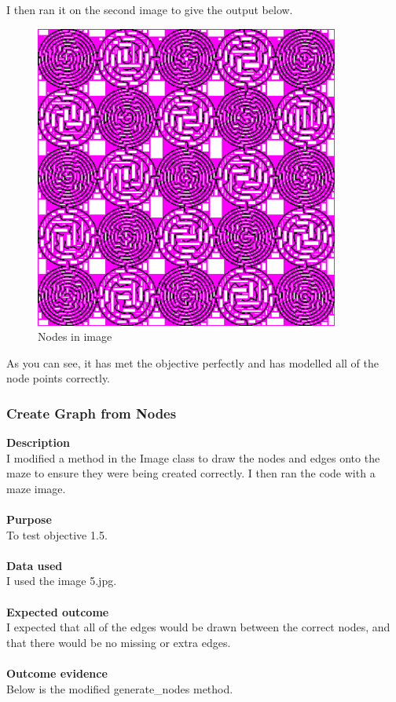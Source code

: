 \documentclass[titlepage]{article}
\begin{document}
I then ran it on the second image to give the output below.

\begin{figure}[H]
  \centering
  \includegraphics[width=10cm]{NodesDisplay5x5.png}
  \caption{Nodes in image}
  \label{fig:dijk}
\end{figure}

As you can see, it has met the objective perfectly and has modelled all of the node points correctly.

\subsubsection{Create Graph from Nodes}
\textbf{Description}\\
I modified a method in the Image class to draw the nodes and edges onto the maze to ensure they were being created correctly. I then ran the code with a maze image.\\\\
\textbf{Purpose}\\
To test objective 1.5.\\\\
\textbf{Data used} \\
I used the image 5.jpg.\\\\
\textbf{Expected outcome}\\
I expected that all of the edges would be drawn between the correct nodes, and that there would be no missing or extra edges. \\\\
\textbf{Outcome evidence}\\
Below is the modified generate\_nodes method.
\end{document}
